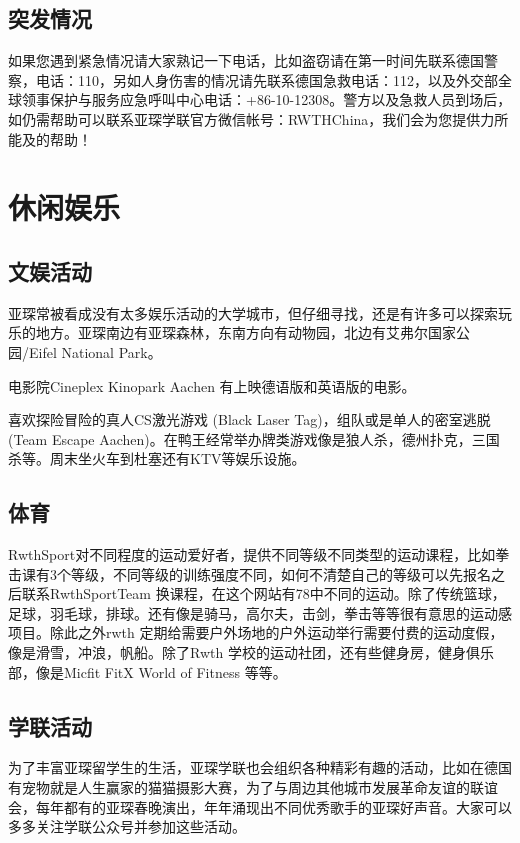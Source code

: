   \subsection{突发情况}

    如果您遇到紧急情况请大家熟记一下电话，比如盗窃请在第一时间先联系德国警察，电话：110，另如人身伤害的情况请先联系德国急救电话：112，以及外交部全球领事保护与服务应急呼叫中心电话：+86-10-12308。警方以及急救人员到场后，如仍需帮助可以联系亚琛学联官方微信帐号：RWTHChina，我们会为您提供力所能及的帮助！

\section{休闲娱乐}

  \subsection{文娱活动}

    亚琛常被看成没有太多娱乐活动的大学城市，但仔细寻找，还是有许多可以探索玩乐的地方。亚琛南边有亚琛森林，东南方向有动物园，北边有艾弗尔国家公园/Eifel National Park。

    电影院Cineplex Kinopark Aachen 有上映德语版和英语版的电影。

    喜欢探险冒险的真人CS激光游戏 (Black Laser Tag)，组队或是单人的密室逃脱 (Team Escape Aachen)。在鸭王经常举办牌类游戏像是狼人杀，德州扑克，三国杀等。周末坐火车到杜塞还有KTV等娱乐设施。

  \subsection{体育}

    RwthSport对不同程度的运动爱好者，提供不同等级不同类型的运动课程，比如拳击课有3个等级，不同等级的训练强度不同，如何不清楚自己的等级可以先报名之后联系RwthSportTeam 换课程，在这个网站有78中不同的运动。除了传统篮球，足球，羽毛球，排球。还有像是骑马，高尔夫，击剑，拳击等等很有意思的运动感项目。除此之外rwth 定期给需要户外场地的户外运动举行需要付费的运动度假，像是滑雪，冲浪，帆船。除了Rwth 学校的运动社团，还有些健身房，健身俱乐部，像是Micfit FitX World of Fitness 等等。

  \subsection{学联活动}

    为了丰富亚琛留学生的生活，亚琛学联也会组织各种精彩有趣的活动，比如在德国有宠物就是人生赢家的猫猫摄影大赛，为了与周边其他城市发展革命友谊的联谊会，每年都有的亚琛春晚演出，年年涌现出不同优秀歌手的亚琛好声音。大家可以多多关注学联公众号并参加这些活动。
